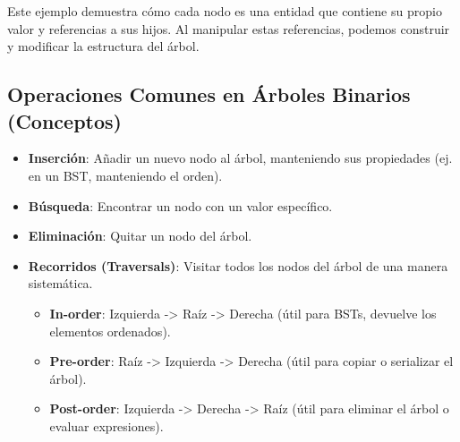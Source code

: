 \documentclass[
  spanish,
  letterpaper,
  DIV=11,
  numbers=noendperiod]{scrreprt}
\newenvironment{Shaded}{\begin{snugshade}}{\end{snugshade}}
\newcommand{\AttributeTok}[1]{\textcolor[rgb]{0.40,0.45,0.13}{#1}}
\newcommand{\CommentTok}[1]{\textcolor[rgb]{0.37,0.37,0.37}{#1}}
\newcommand{\DecValTok}[1]{\textcolor[rgb]{0.68,0.00,0.00}{#1}}
\newcommand{\FunctionTok}[1]{\textcolor[rgb]{0.28,0.35,0.67}{#1}}
\newcommand{\NormalTok}[1]{\textcolor[rgb]{0.00,0.23,0.31}{#1}}
\newcommand{\OtherTok}[1]{\textcolor[rgb]{0.00,0.23,0.31}{#1}}
\newcommand{\SpecialCharTok}[1]{\textcolor[rgb]{0.37,0.37,0.37}{#1}}
\providecommand{\tightlist}{%
  \setlength{\itemsep}{0pt}\setlength{\parskip}{0pt}}
\begin{document}
\begin{Shaded}
\end{Shaded}

Este ejemplo demuestra cómo cada nodo es una entidad que contiene su
propio valor y referencias a sus hijos. Al manipular estas referencias,
podemos construir y modificar la estructura del árbol.

\subsection{Operaciones Comunes en Árboles Binarios
(Conceptos)}\label{operaciones-comunes-en-uxe1rboles-binarios-conceptos}

\begin{itemize}
\tightlist
\item
  \textbf{Inserción}: Añadir un nuevo nodo al árbol, manteniendo sus
  propiedades (ej. en un BST, manteniendo el orden).
\item
  \textbf{Búsqueda}: Encontrar un nodo con un valor específico.
\item
  \textbf{Eliminación}: Quitar un nodo del árbol.
\item
  \textbf{Recorridos (Traversals)}: Visitar todos los nodos del árbol de
  una manera sistemática.

  \begin{itemize}
  \tightlist
  \item
    \textbf{In-order}: Izquierda -\textgreater{} Raíz -\textgreater{}
    Derecha (útil para BSTs, devuelve los elementos ordenados).
  \item
    \textbf{Pre-order}: Raíz -\textgreater{} Izquierda -\textgreater{}
    Derecha (útil para copiar o serializar el árbol).
  \item
    \textbf{Post-order}: Izquierda -\textgreater{} Derecha
    -\textgreater{} Raíz (útil para eliminar el árbol o evaluar
    expresiones).
  \end{itemize}
\end{itemize}
\end{document}
